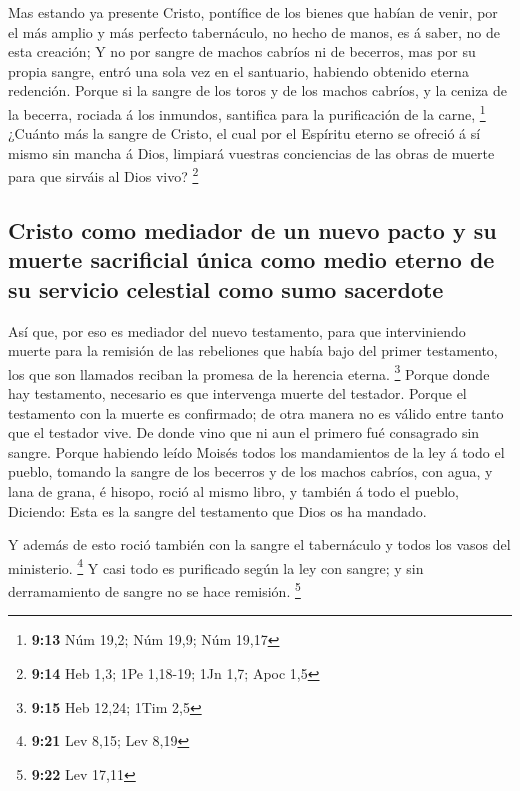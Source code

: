  Mas estando ya presente Cristo, pontífice de los bienes
que habían de venir, por el más amplio y más perfecto tabernáculo, no
hecho de manos, es á saber, no de esta creación;  Y no
por sangre de machos cabríos ni de becerros, mas por su propia sangre,
entró una sola vez en el santuario, habiendo obtenido eterna redención.
 Porque si la sangre de los toros y de los machos
cabríos, y la ceniza de la becerra, rociada á los inmundos, santifica
para la purificación de la carne, \footnote{\textbf{9:13} Núm 19,2; Núm
  19,9; Núm 19,17}  ¿Cuánto más la sangre de Cristo, el
cual por el Espíritu eterno se ofreció á sí mismo sin mancha á Dios,
limpiará vuestras conciencias de las obras de muerte para que sirváis al
Dios vivo? \footnote{\textbf{9:14} Heb 1,3; 1Pe 1,18-19; 1Jn 1,7; Apoc
  1,5}

\hypertarget{cristo-como-mediador-de-un-nuevo-pacto-y-su-muerte-sacrificial-uxfanica-como-medio-eterno-de-su-servicio-celestial-como-sumo-sacerdote}{%
\subsection{Cristo como mediador de un nuevo pacto y su muerte
sacrificial única como medio eterno de su servicio celestial como sumo
sacerdote}\label{cristo-como-mediador-de-un-nuevo-pacto-y-su-muerte-sacrificial-uxfanica-como-medio-eterno-de-su-servicio-celestial-como-sumo-sacerdote}}

 Así que, por eso es mediador del nuevo testamento, para
que interviniendo muerte para la remisión de las rebeliones que había
bajo del primer testamento, los que son llamados reciban la promesa de
la herencia eterna. \footnote{\textbf{9:15} Heb 12,24; 1Tim 2,5}
 Porque donde hay testamento, necesario es que intervenga
muerte del testador.  Porque el testamento con la muerte
es confirmado; de otra manera no es válido entre tanto que el testador
vive.  De donde vino que ni aun el primero fué consagrado
sin sangre.  Porque habiendo leído Moisés todos los
mandamientos de la ley á todo el pueblo, tomando la sangre de los
becerros y de los machos cabríos, con agua, y lana de grana, é hisopo,
roció al mismo libro, y también á todo el pueblo, 
Diciendo: Esta es la sangre del testamento que Dios os ha mandado.

 Y además de esto roció también con la sangre el
tabernáculo y todos los vasos del ministerio. \footnote{\textbf{9:21}
  Lev 8,15; Lev 8,19}  Y casi todo es purificado según la
ley con sangre; y sin derramamiento de sangre no se hace remisión.
\footnote{\textbf{9:22} Lev 17,11}

